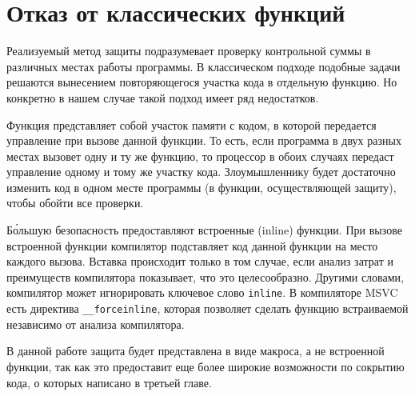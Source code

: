 
\section{Отказ от классических функций}

Реализуемый метод защиты подразумевает проверку контрольной суммы в различных
местах работы программы. В классическом подходе подобные задачи решаются
вынесением повторяющегося участка кода в отдельную функцию. Но конкретно в нашем
случае такой подход имеет ряд недостатков. 

Функция представляет собой участок памяти с кодом, в которой передается
управление при вызове данной функции. То есть, если программа в двух разных
местах вызовет одну и ту же функцию, то процессор в обоих случаях передаст
управление одному и тому же участку кода.  Злоумышленнику будет достаточно
изменить код в одном месте программы (в функции, осуществляющей защиту), чтобы
обойти все проверки. 

Б\'{о}льшую безопасность предоставляют встроенные (inline) функции. При вызове
встроенной функции компилятор подставляет код данной функции на место каждого
вызова. Вставка происходит только в том случае, если анализ затрат и преимуществ
компилятора показывает, что это целесообразно. Другими словами, компилятор может
игнорировать ключевое слово \verb!inline!. В компиляторе MSVC есть директива
\verb!__forceinline!, которая позволяет сделать функцию встраиваемой независимо
от анализа компилятора.

В данной работе защита будет представлена в виде макроса, а не встроенной
функции, так как это предоставит еще более широкие возможности по сокрытию кода,
о которых написано в третьей главе.

